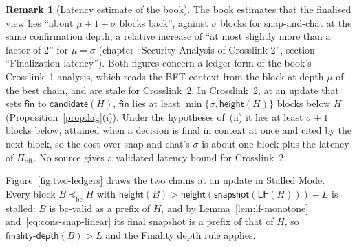 \documentclass[11pt,a4paper]{article}
\theoremstyle{definition}
\newtheorem{remark}[theorem]{Remark}
\newcommand{\bc}{\mathrm{bc}}
\newcommand{\bft}{\mathrm{bft}}
\newcommand{\preceqbc}{\preceq_{\bc}}
\newcommand{\Pibft}{\Pi_{\bft}}
\newcommand{\snapshot}{\mathsf{snapshot}}
\newcommand{\LF}{\mathsf{LF}}
\newcommand{\candidate}{\mathsf{candidate}}
\newcommand{\finalitydepth}{\mathsf{finality\text{-}depth}}
\newcommand{\fin}{\mathsf{fin}}
\begin{document}
\begin{remark}[Latency estimate of the book]\label{rem:latency}
The book estimates that the finalised view lies ``about $\mu + 1 + \sigma$
blocks back'', against $\sigma$ blocks for snap-and-chat at the same
confirmation depth, a relative increase of ``at most slightly more than a
factor of 2'' for $\mu = \sigma$ (chapter ``Security Analysis of Crosslink
2'', section ``Finalization latency''). Both figures concern a ledger form of
the book's Crosslink~1 analysis, which reads the BFT context from the block
at depth $\mu$ of the best chain, and are stale for Crosslink~2. In
Crosslink~2, at an update that sets $\fin$ to $\candidate(H)$, $\fin$ lies at
least $\min\{\sigma, \mathsf{height}(H)\}$ blocks below $H$
(Proposition~\ref{prop:lag}(i)). Under the hypotheses of~(ii) it lies at
least $\sigma + 1$ blocks below, attained when a decision is final in context
at once and cited by the next block, so the cost over snap-and-chat's
$\sigma$ is about one block plus the latency of $\Pibft$. No source gives a
validated latency bound for Crosslink~2.
\end{remark}

Figure~\ref{fig:two-ledgers} draws the two chains at an update in Stalled
Mode. Every block $B \preceqbc H$ with $\mathsf{height}(B) >
\mathsf{height}(\snapshot(\LF(H))) + L$ is stalled: $B$ is
bc-valid as a prefix of $H$, and by Lemma~\ref{lem:lf-monotone}
and~\eqref{eq:cons-snap-linear} its final snapshot is a prefix of that of
$H$, so $\finalitydepth(B) > L$ and the Finality depth rule applies.
\end{document}
